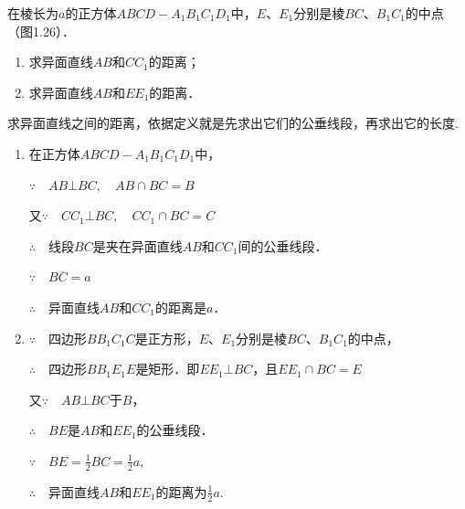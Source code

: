 \begin{example}
    在棱长为$a$的正方体$ABCD-A_1B_1C_1D_1$中，$E$、$E_1$分别是棱$BC$、$B_1C_1$的中点（图1.26）．
\begin{enumerate}[(1)]
    \item 求异面直线$AB$和$CC_1$的距离；
    \item 求异面直线$AB$和$EE_1$的距离．
\end{enumerate}
\end{example}

\begin{analyze}
    求异面直线之间的距离，依据定义就是先求出它们的公垂线段，再求出它的长度.
\end{analyze}

\begin{solution}
\begin{enumerate}[(1)]
\item 在正方体$ABCD-A_1B_1C_1D_1$中，

$\because\quad AB\bot BC,\quad AB\cap BC=B$

又$\because\quad CC_1\bot BC,\quad CC_1\cap BC=C$

$\therefore\quad $线段$BC$是夹在异面直线$AB$和$CC_1$间的公垂线段．

$\because\quad BC=a$

$\therefore\quad$异面直线$AB$和$CC_1$的距离是$a$．
\item $\because\quad$四边形$BB_1C_1C$是正方形，$E$、$E_1$分别是棱$BC$、$B_1C_1$的中点，

$\therefore\quad$四边形$BB_1E_1E$是矩形．即$EE_1\bot BC$，且$EE_1\cap BC=E$

又$\because\quad AB\bot BC$于$B$，

$\therefore\quad BE$是$AB$和$EE_1$的公垂线段．

$\because\quad BE=\frac{1}{2}BC=\frac{1}{2}a$,

$\therefore\quad $异面直线$AB$和$EE_1$的距离为$\frac{1}{2}a$.
\end{enumerate}

\end{solution}

